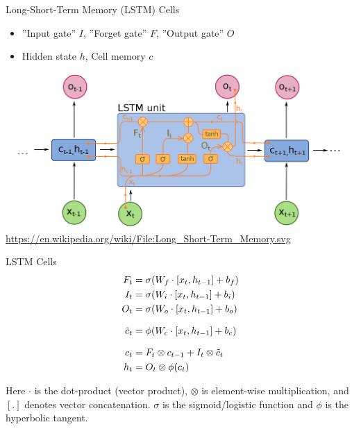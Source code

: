 \documentclass[ignorenonframetext,xcolor=x11names]{beamer}
\begin{document}
\begin{frame}{Long-Short-Term Memory (LSTM) Cells}
\begin{itemize}
   \item ''Input gate'' $I$, ''Forget gate'' $F$, ''Output gate'' $O$
   \item Hidden state $h$, Cell memory $c$
\end{itemize}

\begin{center}
\includegraphics[width=\textwidth]{lstm_wikimedia2.png}
\scriptsize \url{https://en.wikipedia.org/wiki/File:Long_Short-Term_Memory.svg} \normalsize
\end{center}
\end{frame}

\begin{frame}{LSTM Cells}
\begin{align*}
F_t &= \sigma (W_f \cdot [ x_t, h_{t-1}] + b_f) \\
I_t &= \sigma (W_i \cdot [ x_t, h_{t-1}] + b_i) \\
O_t &= \sigma (W_o \cdot [ x_t, h_{t-1}] + b_o) \\[.5\baselineskip]
\tilde{c}_t &= \phi (W_c \cdot [ x_t, h_{t-1}] + b_c) \\[.5\baselineskip]
c_t &= F_t \otimes c_{t-1} + I_t \otimes \tilde{c}_t \\
h_t &= O_t \otimes \phi(c_t) 
\end{align*}

\small
Here $\cdot$ is the dot-product (vector product), $\otimes$ is element-wise multiplication, and $[.]$ denotes vector concatenation. $\sigma$ is the sigmoid/logistic function and $\phi$ is the hyperbolic tangent.
\end{frame}
\end{document}
